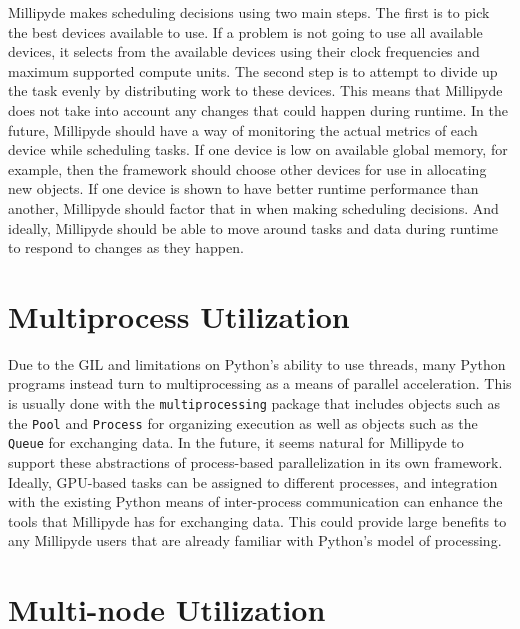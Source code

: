 Millipyde makes scheduling decisions using two main steps. The first is to pick the best devices available to use. If a problem is not going to use all available devices, it selects from the available devices using their clock frequencies and maximum supported compute units. The second step is to attempt to divide up the task evenly by distributing work to these devices. This means that Millipyde does not take into account any changes that could happen during runtime. In the future, Millipyde should have a way of monitoring the actual metrics of each device while scheduling tasks. If one device is low on available global memory, for example, then the framework should choose other devices for use in allocating new objects. If one device is shown to have better runtime performance than another, Millipyde should factor that in when making scheduling decisions. And ideally, Millipyde should be able to move around tasks and data during runtime to respond to changes as they happen.

\section{Multiprocess Utilization}

Due to the GIL and limitations on Python's ability to use threads, many Python programs instead turn to multiprocessing as a means of parallel acceleration. This is usually done with the \verb|multiprocessing| package that includes objects such as the \verb|Pool| and \verb|Process| for organizing execution as well as objects such as the \verb|Queue| for exchanging data. In the future, it seems natural for Millipyde to support these abstractions of process-based parallelization in its own framework. Ideally, GPU-based tasks can be assigned to different processes, and integration with the existing Python means of inter-process communication can enhance the tools that Millipyde has for exchanging data. This could provide large benefits to any Millipyde users that are already familiar with Python's model of processing. 

\section{Multi-node Utilization}

